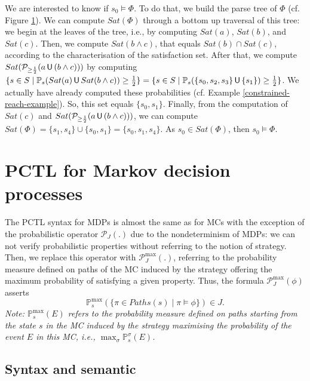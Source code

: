 \begin{example}
\begin{figure}[h!]
\begin{minipage}{0.6\linewidth}
    \captionsetup{justification=centering}
    \label{parse-tree-example}
  \end{minipage}
  \end{figure}
  \noindent We are interested to know if $s_0 \models \Phi$. To do that, we build the parse tree of $\Phi$ (cf. Figure \ref{parse-tree-example}).
  We can compute $Sat(\Phi)$ through a bottom up traversal of this tree: we begin at the leaves of the tree, i.e., by computing $Sat(a)$, $Sat(b)$, and $Sat(c)$. Then, we compute $Sat(b \wedge c)$, that equals $Sat(b)\cap Sat(c)$, according to the characterisation of the satisfaction set.
  After that, we compute
  $Sat(\mathcal{P}_{\geq \frac{1}{2}}(a \,\text{\sffamily U}\, (b \wedge c)))$ by computing $\{ s \in S \; | \; \mathbb{P}_s(Sat(a) \,\text{\sffamily U}\, Sat(b \wedge c)) \geq \frac{1}{2}\} = \{ s \in S \; | \; \mathbb{P}_s(\{s_0, s_2, s_3\} \,\text{\sffamily U}\, \{s_1\}) \geq \frac{1}{2}\}$.
  We actually have already computed these probabilities (cf. Example \ref{constrained-reach-example}).
  So, this set equals $\{ s_0, s_1 \}$.
  Finally, from the computation of $Sat(c)$ and $Sat(\mathcal{P}_{\geq \frac{1}{2}}(a \,\text{\sffamily U}\, (b \wedge c)))$, we can compute $Sat(\Phi) = \{s_1, s_4\} \cup \{s_0, s_1\} = \{s_0, s_1, s_4\}$.
  As $s_0 \in Sat(\Phi)$, then $s_0 \models \Phi$.
\end{example}

\section{PCTL for Markov decision processes}
The PCTL syntax for MDPs is almost the same as for MCs with the exception of the probabilistic operator $\mathcal{P}_J(.)$ due to the nondeterminism of MDPs:
we can not verify probabilistic properties without referring to the notion of strategy.
Then, we replace this operator with $\mathcal{P}^{\max}_J(.)$, referring to the probability measure defined on paths of the MC induced by the strategy offering the maximum probability of satisfying a given property.
Thus, the formula $\mathcal{P}^{\max}_J(\phi)$ asserts \[\mathbb{P}^{\max}_s(\{\pi \in Paths(s) \; | \; \pi \models \phi \}) \in J .\]
\textit{Note: $\mathbb{P}_s^{\max}(E)$ refers to the probability measure defined on paths starting from the state $s$ in the MC induced by the strategy maximising the probability of the event $E$ in this MC, i.e., $\max_{\sigma} \mathbb{P}_s^\sigma(E)$.}

\subsection*{Syntax and semantic}

